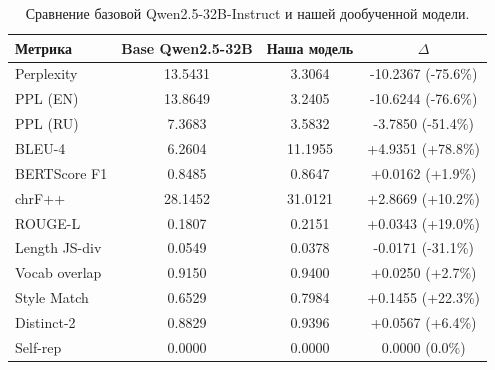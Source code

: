 \begin{table}[tbh!]
\begin{center}
\begin{tabular}{|l|cc|c|}
\hline
Метрика & Base Qwen2.5-32B & Наша модель & $\Delta$ \\
\hline
Perplexity & 13.5431 & 3.3064 & -10.2367 (-75.6\%) \\
PPL (EN) & 13.8649 & 3.2405 & -10.6244 (-76.6\%) \\
PPL (RU) & 7.3683 & 3.5832 & -3.7850 (-51.4\%) \\
BLEU-4 & 6.2604 & 11.1955 & +4.9351 (+78.8\%) \\
BERTScore F1 & 0.8485 & 0.8647 & +0.0162 (+1.9\%) \\
chrF++ & 28.1452 & 31.0121 & +2.8669 (+10.2\%) \\
ROUGE-L & 0.1807 & 0.2151 & +0.0343 (+19.0\%) \\
Length JS-div & 0.0549 & 0.0378 & -0.0171 (-31.1\%) \\
Vocab overlap & 0.9150 & 0.9400 & +0.0250 (+2.7\%) \\
Style Match & 0.6529 & 0.7984 & +0.1455 (+22.3\%) \\
Distinct-2 & 0.8829 & 0.9396 & +0.0567 (+6.4\%) \\
Self-rep & 0.0000 & 0.0000 & 0.0000 (0.0\%) \\
\hline
\end{tabular}
\caption{Сравнение базовой Qwen2.5-32B-Instruct и нашей дообученной модели.}
\label{tab:baseline_comparison}
\end{center}
\end{table}
